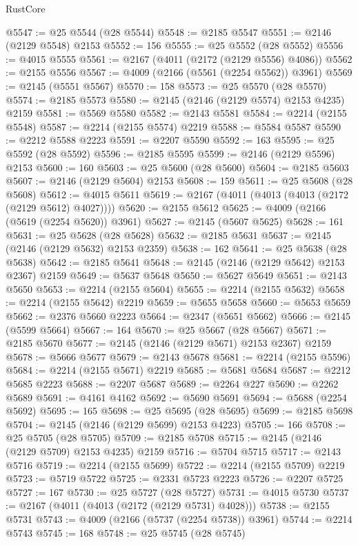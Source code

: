 \begin{lexlean}{RustCore}
\begin{coremodule}
@5547 := @25 @5544 (@28 @5544)
@5548 := @2185 @5547
@5551 := @2146 (@2129 @5548) @2153
@5552 := 156
@5555 := @25 @5552 (@28 @5552)
@5556 := @4015 @5555
@5561 := @2167 (@4011 (@2172 (@2129 @5556) @4086))
@5562 := @2155 @5556
@5567 := @4009 (@2166 (@5561 (@2254 @5562)) @3961)
@5569 := @2145 (@5551 @5567)
@5570 := 158
@5573 := @25 @5570 (@28 @5570)
@5574 := @2185 @5573
@5580 := @2145 (@2146 (@2129 @5574) @2153 @4235) @2159
@5581 := @5569 @5580
@5582 := @2143 @5581
@5584 := @2214 (@2155 @5548)
@5587 := @2214 (@2155 @5574) @2219
@5588 := @5584 @5587
@5590 := @2212 @5588 @2223
@5591 := @2207 @5590
@5592 := 163
@5595 := @25 @5592 (@28 @5592)
@5596 := @2185 @5595
@5599 := @2146 (@2129 @5596) @2153
@5600 := 160
@5603 := @25 @5600 (@28 @5600)
@5604 := @2185 @5603
@5607 := @2146 (@2129 @5604) @2153
@5608 := 159
@5611 := @25 @5608 (@28 @5608)
@5612 := @4015 @5611
@5619 := @2167 (@4011 (@4013 (@4013 (@2172 (@2129 @5612) @4027))))
@5620 := @2155 @5612
@5625 := @4009 (@2166 (@5619 (@2254 @5620)) @3961)
@5627 := @2145 (@5607 @5625)
@5628 := 161
@5631 := @25 @5628 (@28 @5628)
@5632 := @2185 @5631
@5637 := @2145 (@2146 (@2129 @5632) @2153 @2359)
@5638 := 162
@5641 := @25 @5638 (@28 @5638)
@5642 := @2185 @5641
@5648 := @2145 (@2146 (@2129 @5642) @2153 @2367) @2159
@5649 := @5637 @5648
@5650 := @5627 @5649
@5651 := @2143 @5650
@5653 := @2214 (@2155 @5604)
@5655 := @2214 (@2155 @5632)
@5658 := @2214 (@2155 @5642) @2219
@5659 := @5655 @5658
@5660 := @5653 @5659
@5662 := @2376 @5660 @2223
@5664 := @2347 (@5651 @5662)
@5666 := @2145 (@5599 @5664)
@5667 := 164
@5670 := @25 @5667 (@28 @5667)
@5671 := @2185 @5670
@5677 := @2145 (@2146 (@2129 @5671) @2153 @2367) @2159
@5678 := @5666 @5677
@5679 := @2143 @5678
@5681 := @2214 (@2155 @5596)
@5684 := @2214 (@2155 @5671) @2219
@5685 := @5681 @5684
@5687 := @2212 @5685 @2223
@5688 := @2207 @5687
@5689 := @2264 @227
@5690 := @2262 @5689
@5691 := @4161 @4162
@5692 := @5690 @5691
@5694 := @5688 (@2254 @5692)
@5695 := 165
@5698 := @25 @5695 (@28 @5695)
@5699 := @2185 @5698
@5704 := @2145 (@2146 (@2129 @5699) @2153 @4223)
@5705 := 166
@5708 := @25 @5705 (@28 @5705)
@5709 := @2185 @5708
@5715 := @2145 (@2146 (@2129 @5709) @2153 @4235) @2159
@5716 := @5704 @5715
@5717 := @2143 @5716
@5719 := @2214 (@2155 @5699)
@5722 := @2214 (@2155 @5709) @2219
@5723 := @5719 @5722
@5725 := @2331 @5723 @2223
@5726 := @2207 @5725
@5727 := 167
@5730 := @25 @5727 (@28 @5727)
@5731 := @4015 @5730
@5737 := @2167 (@4011 (@4013 (@2172 (@2129 @5731) @4028)))
@5738 := @2155 @5731
@5743 := @4009 (@2166 (@5737 (@2254 @5738)) @3961)
@5744 := @2214 @5743
@5745 := 168
@5748 := @25 @5745 (@28 @5745)

\end{coremodule}
\end{lexlean}
